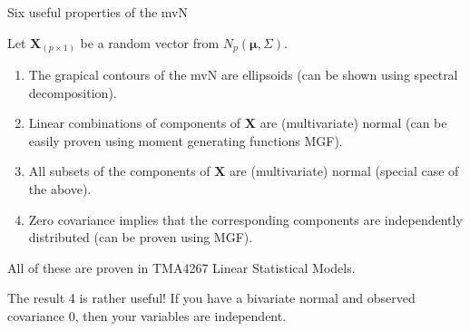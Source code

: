 \documentclass[ignorenonframetext,]{beamer}
\providecommand{\tightlist}{%
  \setlength{\itemsep}{0pt}\setlength{\parskip}{0pt}}
\begin{document}
\begin{frame}

\begin{block}{Six useful properties of the mvN}

Let \(\mathbf{X}_{(p\times 1)}\) be a random vector from
\(N_p(\mathbf{\mu},\Sigma)\).

\begin{enumerate}
\def\labelenumi{\arabic{enumi}.}
\tightlist
\item
  The grapical contours of the mvN are ellipsoids (can be shown using
  spectral decomposition).
\item
  Linear combinations of components of \(\mathbf{X}\) are (multivariate)
  normal (can be easily proven using moment generating functions MGF).
\item
  All subsets of the components of \(\mathbf{X}\) are (multivariate)
  normal (special case of the above).
\item
  Zero covariance implies that the corresponding components are
  independently distributed (can be proven using MGF).
\end{enumerate}

\end{block}

\end{frame}

\begin{frame}

All of these are proven in TMA4267 Linear Statistical Models.

The result 4 is rather useful! If you have a bivariate normal and
observed covariance 0, then your variables are independent.

\end{frame}
\end{document}

